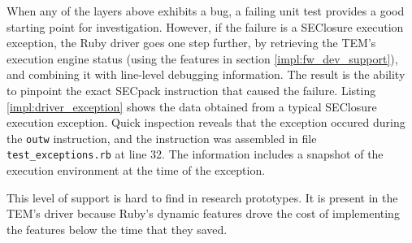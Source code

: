 When any of the layers above exhibits a bug, a failing unit test provides a good
starting point for investigation. However, if the failure is a SEClosure execution exception, the Ruby driver goes one step further, by retrieving the TEM's execution engine status (using the features in section
\ref{impl:fw_dev_support}), and combining it with line-level debugging
information. The result is the ability to pinpoint the exact SECpack
instruction that caused the failure. Listing \ref{impl:driver_exception} shows
the data obtained from a typical SEClosure execution exception. Quick inspection
reveals that the exception occured during the \texttt{outw} instruction, and the
instruction was assembled in file \texttt{test\_exceptions.rb} at line 32. The
information includes a snapshot of the execution environment at the time of the
exception.



This level of support is hard to find in research prototypes. It is present in
the TEM's driver because Ruby's dynamic features drove the cost of implementing
the features below the time that they saved.